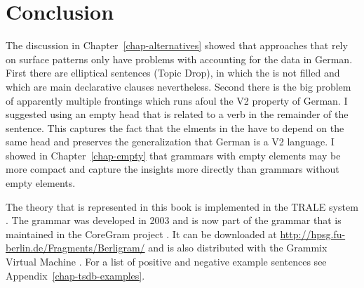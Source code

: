 \chapter{Conclusion}


The discussion in Chapter~\ref{chap-alternatives} showed that approaches that rely on surface patterns only have
problems with accounting for the data in German. First there are elliptical sentences (Topic Drop),
in which the \vf is not filled and which are main declarative clauses nevertheless. Second there is the
big problem of apparently multiple frontings which runs afoul the V2 property of German. I suggested
using an empty head that is related to a verb in the remainder of the sentence. This captures the
fact that the elments in the \vf have to depend on the same head and preserves the generalization
that German is a V2 language. I showed in Chapter~\ref{chap-empty} that grammars with empty elements
may be more compact and capture the insights more directly than grammars without empty elements.

The theory that is represented in this book is implemented in the TRALE system
\citep*{MPR2002a-u,Penn2004a-u}. The grammar was developed in 2003 and is now part of the grammar
that is maintained in the CoreGram project \citep{MuellerCoreGramBrief,MuellerCoreGram}. It can
be downloaded at \url{http://hpsg.fu-berlin.de/Fragments/Berligram/} and is also distributed with the Grammix Virtual Machine \citep{MuellerGrammix}. For a list of positive and negative example sentences see Appendix~\ref{chap-tsdb-examples}.






